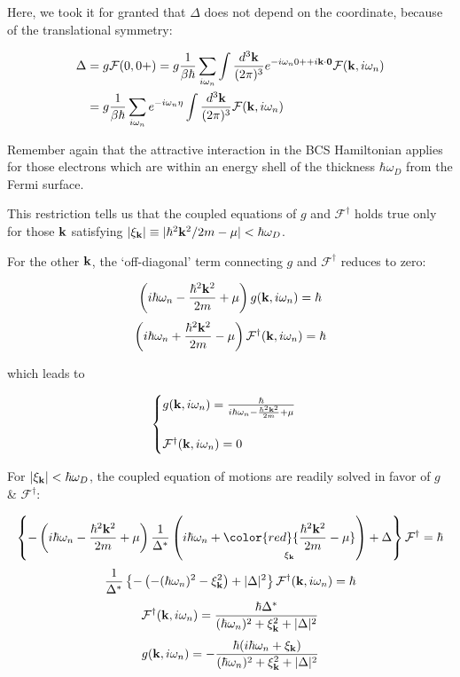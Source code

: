 Here, we took it for granted that $\Delta$ does not depend on the coordinate, because of the translational symmetry:

\[\begin{split}
\Delta&=g\mathcal{F}(0,0+)=g\frac{1}{\beta\hbar}\sum_{i\omega_n}\int\frac{d^3\bf k}{(2\pi)^3}e^{-i\omega_n0++i\bf k\cdot 0}\mathcal{F}({\bf k},i\omega_n)\\
&=g\frac{1}{\beta\hbar}\sum_{i\omega_n} e^{-i\omega_n\eta}\int\frac{d^3\bf k}{(2\pi)^3}\mathcal{F}({\bf k},i\omega_n)
\end{split}\]

Remember again that the attractive interaction in the BCS Hamiltonian applies for those electrons which are within an energy shell of the thickness $\hbar\omega_D$ from the Fermi surface. 

This restriction tells us that the coupled equations of $g$ and $\mathcal{F}^\dagger$ holds true only for those $\bf k$ satisfying $|\xi_{\bf k}|\equiv|\hbar^2{\bf k}^2/2m - \mu|<\hbar\omega_D$. 

For the other ${\bf k}$, the `off-diagonal' term connecting $g$ and $\mathcal{F}^\dagger$ reduces to zero:

\[\left(i\hbar\omega_n-\frac{\hbar^2{\bf k}^2}{2m}+\mu\right)g({\bf k},i\omega_n)=\hbar\]
\[\left(i\hbar\omega_n+\frac{\hbar^2{\bf k}^2}{2m}-\mu\right)\mathcal{F}^\dagger({\bf k},i\omega_n)=\hbar\]

which leads to

\[\begin{cases}
g({\bf k},i\omega_n)=\frac{\hbar}{i\hbar\omega_n-\frac{\hbar^2{\bf k}^2}{2m}+\mu}\\
\ \\
\mathcal{F}^\dagger({\bf k},i\omega_n) = 0
\end{cases}\]

For $|\xi_{\bf k}|<\hbar\omega_D$, the coupled equation of motions are readily solved in favor of $g$ \& $\mathcal{F}^\dagger$:

\[\left\{-\left(i\hbar\omega_n-\frac{\hbar^2{\bf k}^2}{2m}+\mu\right)\frac{1}{\Delta^*}\left(i\hbar\omega_n+\underset{\xi_{\bf k}}{{\color{red}{\frac{\hbar^2{\bf k}^2}{2m}-\mu}}}\right)+\Delta\right\}\mathcal{F}^\dagger = \hbar\]
\[\frac{1}{\Delta^*}\left\{-\left(-(\hbar\omega_n)^2-\xi_{\bf k}^2\right)+|\Delta|^2\right\}\mathcal{F}^\dagger({\bf k},i\omega_n) = \hbar\]
\[\mathcal{F}^\dagger({\bf k},i\omega_n) = \frac{\hbar\Delta^*}{(\hbar\omega_n)^2+\xi_{\bf k}^2+|\Delta|^2} \]
\[g({\bf k},i\omega_n) = -\frac{\hbar(i\hbar\omega_n+\xi_{\bf k})}{(\hbar\omega_n)^2+\xi_{\bf k}^2+|\Delta|^2} \]

